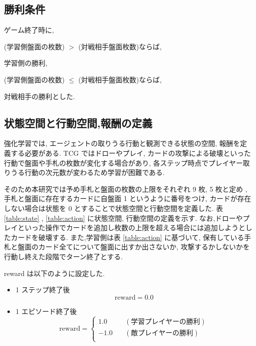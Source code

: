 \documentclass[twocolumn]{jarticle}
\begin{document}
\subsection{勝利条件}
ゲーム終了時に,\par
(学習側盤面の枚数) $>$ (対戦相手盤面枚数)ならば,\par
学習側の勝利, \par 
(学習側盤面の枚数) $\leq$ (対戦相手盤面枚数)ならば,\par
対戦相手の勝利とした.\par 



\subsection{状態空間と行動空間,報酬の定義}
強化学習では, エージェントの取りうる行動と観測できる状態の空間, 報酬を定義する必要がある. 
TCG ではドローやプレイ, カードの攻撃による破壊といった行動で盤面や手札の枚数が変化する場合があり, 各ステップ時点でプレイヤー取りうる行動の次元数が変わるため学習が困難である.\par
そのため本研究では予め手札と盤面の枚数の上限をそれぞれ 9 枚, 5 枚と定め , 手札と盤面に存在するカードに自盤面 1 というように番号をつけ, カードが存在しない場合は状態を 0 とすることで状態空間と行動空間を定義した. 表 \ref{table:state} , \ref{table:action} に状態空間, 行動空間の定義を示す.
なお,ドローやプレイといった操作でカードを追加し枚数の上限を超える場合には追加しようとしたカードを破壊する.
また,学習側は表 \ref{table:action} に基づいて, 保有している手札と盤面のカード全てについて盤面に出すか出さないか, 攻撃するかしないかを行動し終えた段階でターン終了とする.\par
reward は以下のように設定した.\par
\begin{itemize}
  \item 1 ステップ終了後 
  \begin{equation*}
   \mathrm{reward} = 0.0  
  \end{equation*}
  \item 1 エピソード終了後
  \begin{equation*}
    \mathrm{reward} = 
    \left\{
      \begin{aligned}
          1.0 \quad & (学習プレイヤーの勝利) \\
          -1.0 \quad & (敵プレイヤーの勝利) \\
      \end{aligned}
      \right.
  \end{equation*} 
\end{itemize}
\end{document}
